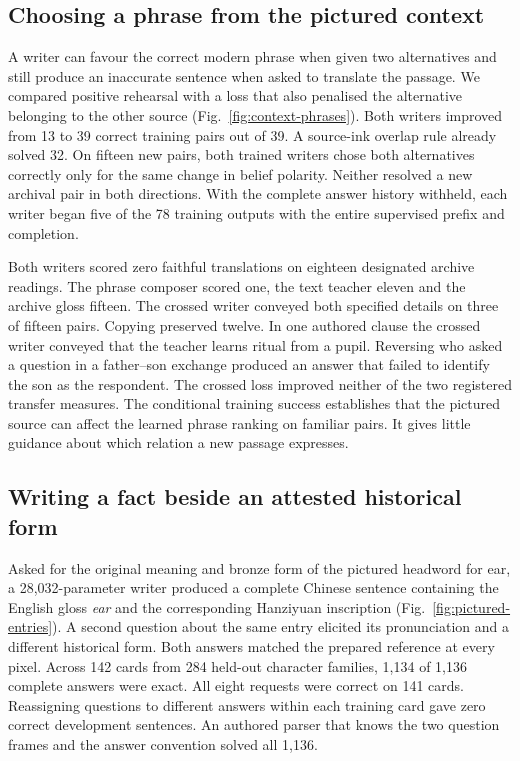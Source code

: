 \documentclass[12pt,a4paper]{article}
\providecommand{\DIFadd}[1]{{\protect\color{blue} \sf #1}} %
\begin{document}
\subsection*{\DIFadd{Choosing a phrase from the pictured context}}
\DIFadd{A writer can favour the correct modern phrase when given two alternatives and still produce an inaccurate sentence when asked to translate the passage. We compared positive rehearsal with a loss that also penalised the alternative belonging to the other source (Fig.~\ref{fig:context-phrases}). Both writers improved from 13 to 39 correct training pairs out of 39. A source-ink overlap rule already solved 32. On fifteen new pairs, both trained writers chose both alternatives correctly only for the same change in belief polarity. Neither resolved a new archival pair in both directions. With the complete answer history withheld, each writer began five of the 78 training outputs with the entire supervised prefix and completion.
}

\DIFadd{Both writers scored zero faithful translations on eighteen designated archive readings. The phrase composer scored one, the text teacher eleven and the archive gloss fifteen. The crossed writer conveyed both specified details on three of fifteen pairs. Copying preserved twelve. In one authored clause the crossed writer conveyed that the teacher learns ritual from a pupil. Reversing who asked a question in a father--son exchange produced an answer that failed to identify the son as the respondent. The crossed loss improved neither of the two registered transfer measures. The conditional training success establishes that the pictured source can affect the learned phrase ranking on familiar pairs. It gives little guidance about which relation a new passage expresses.
}

\subsection*{\DIFadd{Writing a fact beside an attested historical form}}
\DIFadd{Asked for the original meaning and bronze form of the pictured headword for ear, a 28,032-parameter writer produced a complete Chinese sentence containing the English gloss \emph{ear} and the corresponding Hanziyuan inscription (Fig.~\ref{fig:pictured-entries}). A second question about the same entry elicited its pronunciation and a different historical form. Both answers matched the prepared reference at every pixel. Across 142 cards from 284 held-out character families, 1,134 of 1,136 complete answers were exact. All eight requests were correct on 141 cards. Reassigning questions to different answers within each training card gave zero correct development sentences. An authored parser that knows the two question frames and the answer convention solved all 1,136.
}
\end{document}
